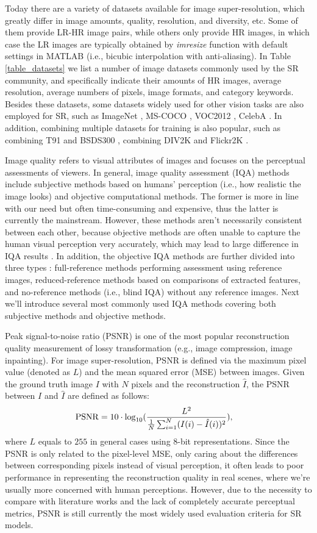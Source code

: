 Today there are a variety of datasets available for image super-resolution, which greatly differ in image amounts, quality, resolution, and diversity, etc.
Some of them provide LR-HR image pairs, while others only provide HR images, in which case the LR images are typically obtained by \textit{imresize} function with default settings in MATLAB (i.e., bicubic interpolation with anti-aliasing).
In Table \ref{table_datasets} we list a number of image datasets commonly used by the SR community, and specifically indicate their amounts of HR images, average resolution, average numbers of pixels, image formats, and category keywords.
Besides these datasets, some datasets widely used for other vision tasks are also employed for SR, such as ImageNet , MS-COCO , VOC2012 , CelebA .  
In addition, combining multiple datasets for training is also popular, such as combining T91 and BSDS300 , combining DIV2K and Flickr2K .

\label{sec_iqa}
Image quality refers to visual attributes of images and focuses on the perceptual assessments of viewers.
In general, image quality assessment (IQA) methods include subjective methods based on humans' perception (i.e., how realistic the image looks) and objective computational methods.  
The former is more in line with our need but often time-consuming and expensive, thus the latter is currently the mainstream.
However, these methods aren't necessarily consistent between each other, because objective methods are often unable to capture the human visual perception very accurately, which may lead to large difference in IQA results .
In addition, the objective IQA methods are further divided into three types : full-reference methods performing assessment using reference images, reduced-reference methods based on comparisons of extracted features, and no-reference methods (i.e., blind IQA) without any reference images.
Next we'll introduce several most commonly used IQA methods covering both subjective methods and objective methods.

\label{sec_iqa_psnr}
Peak signal-to-noise ratio (PSNR) is one of the most popular reconstruction quality measurement of lossy transformation (e.g., image compression, image inpainting).
For image super-resolution, PSNR is defined via the maximum pixel value (denoted as $L$) and the mean squared error (MSE) between images.
Given the ground truth image $I$ with $N$ pixels and the reconstruction $\hat{I}$, the PSNR between $I$ and $\hat{I}$ are defined as follows:
\begin{align}
    \label{equ:mse}
    {\rm PSNR} &= 10 \cdot \log_{10} (\frac {L^2} {\frac{1}{N} \sum_{i=1}^{N} (I(i) - \hat{I}(i)) ^2}) ,
\end{align}
where $L$ equals to $255$ in general cases using 8-bit representations.
Since the PSNR is only related to the pixel-level MSE, only caring about the differences between corresponding pixels instead of visual perception, it often leads to poor performance in representing the reconstruction quality in real scenes, where we're usually more concerned with human perceptions.
However, due to the necessity to compare with literature works and the lack of completely accurate perceptual metrics, PSNR is still currently the most widely used evaluation criteria for SR models.


